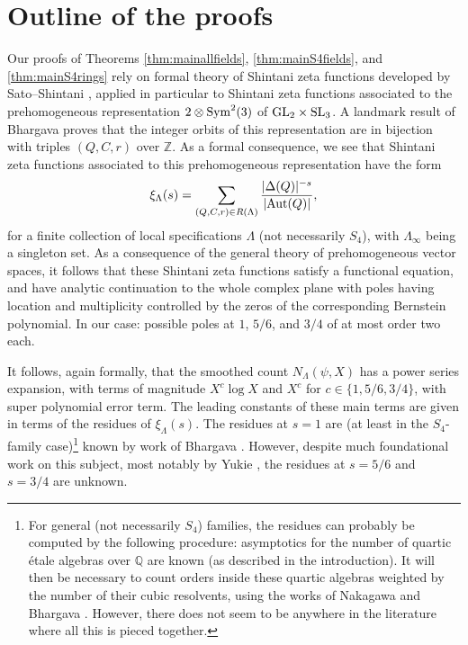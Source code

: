 \documentclass{article}
\def\Z{{\mathbb Z}}
\def\SL{{\rm SL}}
\def\GL{{\rm GL}}
\def\Sym{{\rm Sym}}
\def\Aut{{\rm Aut}}
\def\Q{{\mathbb Q}}
\def\Z{{\mathbb Z}}
\def\Q{{\mathbb Q}}
\begin{document}
\section{Outline of the proofs}


Our proofs of Theorems \ref{thm:mainallfields}, \ref{thm:mainS4fields}, and \ref{thm:mainS4rings} rely on formal theory of Shintani zeta functions developed by Sato--Shintani \cite{SatoShintani}, applied in particular to Shintani zeta functions associated to the prehomogeneous representation $2\otimes\Sym^2(3)$ of $\GL_2\times\SL_3$. A landmark result of Bhargava \cite{BHCL3} proves that the integer orbits of this representation are in bijection with triples $(Q,C,r)$ over $\Z$. As a formal consequence, we see that Shintani zeta functions associated to this prehomogeneous representation have the form
\begin{equation*}
\xi_\Lambda(s)=\sum_{(Q,C,r)\in R(\Lambda)}\frac{|\Delta(Q)|^{-s}}{|\Aut(Q)|},
\end{equation*}
for a finite collection of local specifications $\Lambda$ (not necessarily $S_4$), with $\Lambda_\infty$ being a singleton set. As a consequence of the general theory of prehomogeneous vector spaces, it follows that these Shintani zeta functions satisfy a functional equation, and have analytic continuation to the whole complex plane with poles having location and multiplicity controlled by the zeros of the corresponding Bernstein polynomial. In our case: possible poles at $1$, $5/6$, and $3/4$ of at most order two each. 

It follows, again formally, that the smoothed count $N_\Lambda(\psi,X)$ has a power series expansion, with terms of magnitude $X^c\log X$ and $X^c$ for $c\in\{1,5/6,3/4\}$, with super polynomial error term. The leading constants of these main terms are given in terms of the residues of $\xi_\Lambda(s)$. The residues at $s=1$ are (at least in the $S_4$-family case)\footnote{For general (not necessarily $S_4$) families, the residues can probably be computed by the following procedure: asymptotics for the number of quartic \'etale algebras over $\Q$ are known (as described in the introduction). It will then be necessary to count orders inside these quartic algebras weighted by the number of their cubic resolvents, using the works of Nakagawa \cite{nakagawa} and Bhargava \cite{BHCL3}. However, there does not seem to be anywhere in the literature where all this is pieced together.} known by work of Bhargava \cite{dodqf}.
However, despite much foundational work on this subject, most notably by Yukie \cite{Yukie}, the residues at $s=5/6$ and $s=3/4$ are unknown.
\end{document}
